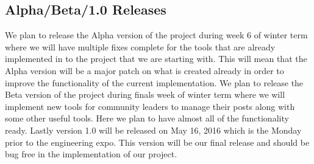 \documentclass[draftclsnofoot,10pt,onecolumn]{IEEEtran} %
\begin{document}
\subsection{Alpha/Beta/1.0 Releases}
We plan to release the Alpha version of the project during week 6 of winter term where we will have multiple fixes complete for the tools that are already implemented in to the project that we are starting with. This will mean that the Alpha version will be a major patch on what is created already in order to improve the functionality of the current implementation. We plan to release the Beta version of the project during finals week of winter term where we will implement new tools for community leaders to manage their posts along with some other useful tools. Here we plan to have almost all of the functionality ready. Lastly version 1.0 will be released on May 16, 2016 which is the Monday prior to the engineering expo. This version will be our final release and should be bug free in the implementation of our project.
\end{document}
